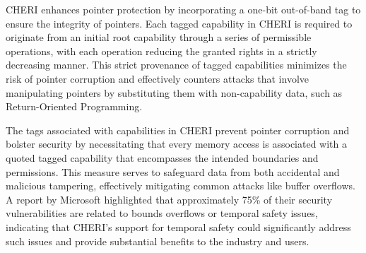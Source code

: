 
CHERI enhances pointer protection by incorporating a one-bit out-of-band tag to ensure the integrity of pointers. Each tagged capability in CHERI is required to originate from an initial root capability through a series of permissible 
operations, with each operation reducing the granted rights in a strictly decreasing manner. This strict provenance of tagged capabilities minimizes the 
risk of pointer corruption and effectively counters attacks that 
involve manipulating pointers by substituting them with non-capability data, such as Return-Oriented Programming.

The tags associated with capabilities in CHERI prevent pointer corruption and bolster security by necessitating that every memory access is 
associated with a quoted tagged capability that encompasses the intended boundaries and permissions. This measure serves to safeguard data 
from both accidental and malicious tampering, effectively mitigating common attacks like buffer overflows. A report by Microsoft highlighted that 
approximately 75\% of their security vulnerabilities are related to bounds overflows or temporal safety issues, indicating that CHERI's support for temporal safety 
could significantly address such issues and provide substantial benefits to the industry and users.

